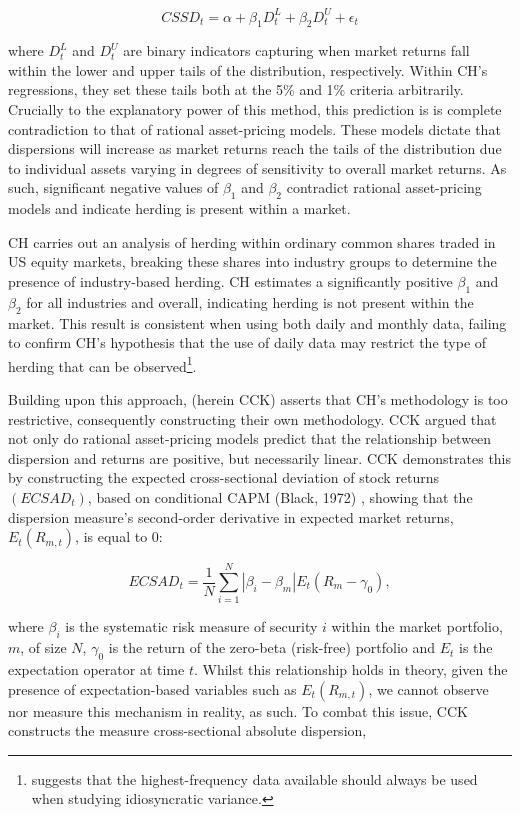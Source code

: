 \documentclass[12pt]{article}
\numberwithin{table}{section}   %
\begin{document}
$$
CSSD_t=\alpha+\beta_1D^L_t+\beta_2D^U_t+\epsilon_t
$$

where $D^L_t$ and $D^U_t$ are binary indicators capturing when market returns fall within the lower and upper tails of the distribution, respectively. Within CH’s regressions, they set these tails both at the 5\% and 1\% criteria arbitrarily. Crucially to the explanatory power of this method, this prediction is is complete contradiction to that of rational asset-pricing models. These models dictate that dispersions will increase as market returns reach the tails of the distribution due to individual assets varying in degrees of sensitivity to overall market returns. As such, significant negative values of $\beta_1$ and $\beta_2$ contradict rational asset-pricing models and indicate herding is present within a market.

CH carries out an analysis of herding within ordinary common shares traded in US equity markets, breaking these shares into industry groups to determine the presence of industry-based herding. CH estimates a significantly positive $\beta_1$ and $\beta_2$ for all industries and overall, indicating herding is not present within the market. This result is consistent when using both daily and monthly data, failing to confirm CH’s hypothesis that the use of daily data may restrict the type of herding that can be observed\footnote{\citet{richards} suggests that the highest-frequency data available should always be used when studying idiosyncratic variance.}.

Building upon this approach, \citet{cck} (herein CCK) asserts that CH’s methodology is too restrictive, consequently constructing their own methodology. CCK argued that not only do rational asset-pricing models predict that the relationship between dispersion and returns are positive, but necessarily linear. CCK demonstrates this by constructing the expected cross-sectional deviation of stock returns $(ECSAD_t)$, based on conditional CAPM (Black, 1972) , showing that the dispersion measure’s second-order derivative in expected market returns, $E_t(R_{m,t})$, is equal to 0:

$$
ECSAD_t=\frac{1}{N}\sum^N_{i=1}|\beta_i-\beta_m|E_t(R_m-\gamma_0),
$$

where $\beta_i$ is the systematic risk measure of security $i$ within the market portfolio, $m$, of size $N$, $\gamma_0$ is the return of the zero-beta (risk-free) portfolio and $E_t$ is the expectation operator at time $t$. Whilst this relationship holds in theory, given the presence of expectation-based variables such as $E_t(R_{m,t})$, we cannot observe nor measure this mechanism in reality, as such. To combat this issue, CCK constructs the measure cross-sectional absolute dispersion,
\end{document}
